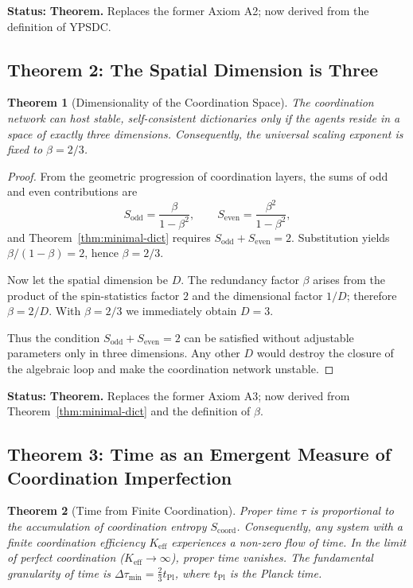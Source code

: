\documentclass[12pt,a4paper]{article}
\newtheorem{theorem}{Theorem}[section]
\begin{document}
	\textbf{Status:} \textbf{Theorem.} Replaces the former Axiom A2; now derived from the definition of YPSDC.
	
	\subsection{Theorem 2: The Spatial Dimension is Three}
	
	\begin{theorem}[Dimensionality of the Coordination Space]
		\label{thm:dimension}
		The coordination network can host stable, self-consistent dictionaries only if the agents reside in a space of exactly three dimensions. Consequently, the universal scaling exponent is fixed to \(\beta = 2/3\).
	\end{theorem}
	
	\begin{proof}
		From the geometric progression of coordination layers, the sums of odd and even contributions are
		\[
		S_{\mathrm{odd}} = \frac{\beta}{1-\beta^2}, \qquad
		S_{\mathrm{even}} = \frac{\beta^2}{1-\beta^2},
		\]
		and Theorem~\ref{thm:minimal-dict} requires \(S_{\mathrm{odd}} + S_{\mathrm{even}} = 2\).
		Substitution yields \(\beta/(1-\beta) = 2\), hence \(\beta = 2/3\).
		
		Now let the spatial dimension be \(D\). The redundancy factor \(\beta\) arises from the product of the spin-statistics factor \(2\) and the dimensional factor \(1/D\); therefore \(\beta = 2/D\). With \(\beta = 2/3\) we immediately obtain \(D = 3\).
		
		Thus the condition \(S_{\mathrm{odd}} + S_{\mathrm{even}} = 2\) can be satisfied without adjustable parameters only in three dimensions. Any other \(D\) would destroy the closure of the algebraic loop and make the coordination network unstable.
	\end{proof}
	
	\textbf{Status:} \textbf{Theorem.} Replaces the former Axiom A3; now derived from Theorem~\ref{thm:minimal-dict} and the definition of \(\beta\).
	
	\subsection{Theorem 3: Time as an Emergent Measure of Coordination Imperfection}
	
	\begin{theorem}[Time from Finite Coordination]
		\label{thm:time}
		Proper time \(\tau\) is proportional to the accumulation of coordination entropy \(S_{\mathrm{coord}}\). Consequently, any system with a finite coordination efficiency \(K_{\mathrm{eff}}\) experiences a non-zero flow of time. In the limit of perfect coordination (\(K_{\mathrm{eff}} \to \infty\)), proper time vanishes. The fundamental granularity of time is \(\Delta \tau_{\min} = \frac{2}{3} t_{\mathrm{Pl}}\), where \(t_{\mathrm{Pl}}\) is the Planck time.
	\end{theorem}
	
\end{document}
